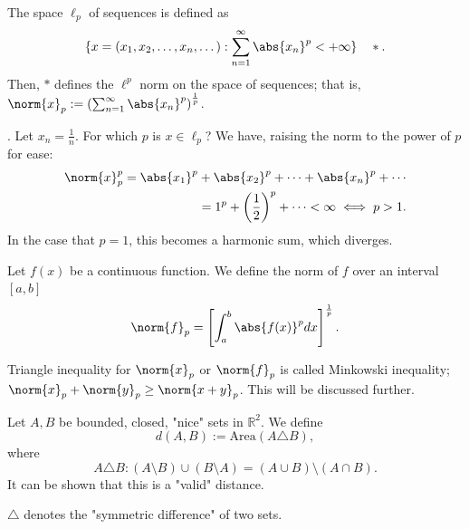 \begin{definition}[$\ell_p$]
    The space $\ell_p$ of sequences is defined as \[
    \{x = (x_1, x_2, \dots, x_n, \dots) : \sum_{n=1}^{\infty} \abs{x_n}^p < + \infty\} \quad \ast.
    \]
    Then, $\ast$ defines the $\ell^p$ norm on the space of sequences; that is, $\norm{x}_p := \left(\sum_{n = 1}^\infty \abs{x_n}^p\right)^{\frac{1}{p}}$.
\end{definition}

\begin{example}[$\ell_p$, $x_n = \frac{1}{n}$].
   Let $x_n = \frac{1}{n}$. For which $p$ is $x \in \ell_p$? We have, raising the norm to the power of $p$ for ease:
   \begin{align*}
    \norm{x}_p^p = \abs{x_1}^p + \abs{x_2}^p + \cdots + \abs{x_n}^p + \cdots\\
    = 1^p + \left(\frac{1}{2}\right)^p + \cdots < \infty \iff p > 1.
   \end{align*}
   In the case that $p = 1$, this becomes a harmonic sum, which diverges.
\end{example}

\begin{example}
    Let $f(x)$ be a continuous function. We define the norm of $f$ over an interval $[a, b]$
    $$
    \norm{f}_p = \left[\int_{a}^{b}\abs{f(x)}^p dx \right]^{\frac{1}{p}}.
    $$
\end{example}

\begin{remark}
    Triangle inequality for $\norm{x}_p$ or $\norm{f}_p$ is called Minkowski inequality; $\norm{x}_p + \norm{y}_p \geq \norm{x + y}_p$. This will be discussed further.
\end{remark}

\begin{example}
    Let $A, B$ be bounded, closed, "nice" sets in $\mathbb{R}^2$. We define \[
        d(A, B) := \text{Area}(A \triangle B),
        \]
        where $$A \triangle B : (A \setminus B) \cup (B \setminus A) = (A \cup B) \setminus (A \cap B).$$ It can be shown that this is a "valid" distance.
\end{example}

\begin{remark}
    $\triangle$ denotes the "symmetric difference" of two sets.
\end{remark}


